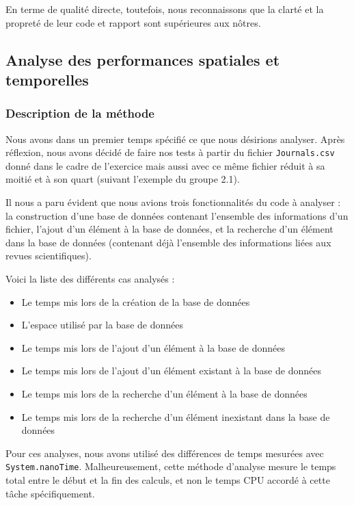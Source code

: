 \documentclass[a4paper,10pt]{article}
\begin{document}
	En terme de qualité directe, toutefois, nous reconnaissons que la clarté et la propreté de leur code et rapport sont supérieures aux nôtres.

\subsection{Analyse des performances spatiales et temporelles}

\subsubsection{Description de la méthode}

	Nous avons dans un premier temps spécifié ce que nous désirions analyser. Après réflexion, nous avons décidé de faire nos tests à partir du fichier \texttt{Journals.csv} donné dans le cadre de l'exercice mais aussi avec ce même fichier réduit à sa moitié et à son quart (suivant l'exemple du groupe 2.1). 
	
	Il nous a paru évident que nous avions trois fonctionnalités du code à analyser : la construction d'une base de données contenant l'ensemble des informations d'un fichier, l'ajout d'un élément à la base de données, et la recherche d'un élément dans la base de données (contenant déjà l'ensemble des informations liées aux revues scientifiques).

Voici la liste des différents cas analysés :

\begin{itemize}
\item Le temps mis lors de la création de la base de données
\item L'espace utilisé par la base de données
\item Le temps mis lors de l'ajout d'un élément à la base de données
\item Le temps mis lors de l'ajout d'un élément existant à la base de données
\item Le temps mis lors de la recherche d'un élément à la base de données
\item Le temps mis lors de la recherche d'un élément inexistant dans la base de données
\end{itemize}
 
	Pour ces analyses, nous avons utilisé des différences de temps mesurées avec \texttt{System.nanoTime}. Malheureusement, cette méthode d'analyse mesure le temps total entre le début et la fin des calculs, et non le temps CPU accordé à cette tâche spécifiquement. 
	
\end{document}
